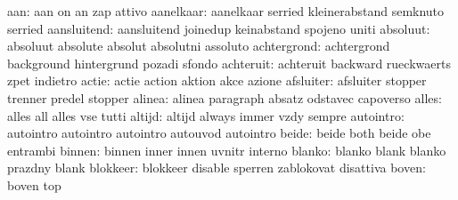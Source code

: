                       aan: aan                       on
                           an                        zap
                           attivo
                aanelkaar: aanelkaar                 serried
                           kleinerabstand            semknuto
                           serried                   %
              aansluitend: aansluitend               joinedup
                           keinabstand               spojeno
                           uniti
                 absoluut: absoluut                  absolute
                           absolut                   absolutni
                           assoluto
              achtergrond: achtergrond               background
                           hintergrund               pozadi
                           sfondo
                achteruit: achteruit                 backward
                           rueckwaerts               zpet
                           indietro
                    actie: actie                     action
                           aktion                    akce
                           azione
                afsluiter: afsluiter                 stopper
                           trenner                   predel
                           stopper
                   alinea: alinea                    paragraph
                           absatz                    odstavec
                           capoverso %
                    alles: alles                     all
                           alles                     vse
                           tutti
                   altijd: altijd                    always
                           immer                     vzdy
                           sempre
                autointro: autointro                 autointro
                           autointro                 autouvod
                           autointro
                    beide: beide                     both
                           beide                     obe
                           entrambi
                   binnen: binnen                    inner
                           innen                     uvnitr
                           interno
                   blanko: blanko                    blank
                           blanko                    prazdny
                           blank                     %
                 blokkeer: blokkeer                  disable
                           sperren                   zablokovat
                           disattiva
                    boven: boven                     top
